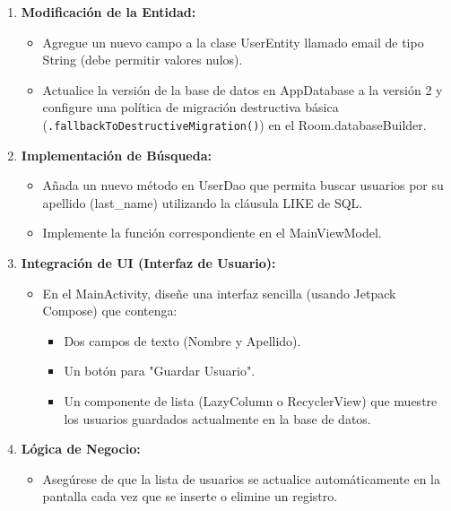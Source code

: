 \documentclass[10pt,letterpaper]{article}
\begin{document}
\newpage
\begin{enumerate}[label=\arabic*.]
  \item \textbf{Modificación de la Entidad:}
    \begin{itemize}
      \item Agregue un nuevo campo a la clase UserEntity llamado email de tipo String (debe permitir valores nulos).
      \item Actualice la versión de la base de datos en AppDatabase a la versión 2 y configure una política de migración destructiva básica (\texttt{.fallbackToDestructiveMigration()}) en el Room.databaseBuilder.
    \end{itemize}

  \item \textbf{Implementación de Búsqueda:}
    \begin{itemize}
      \item Añada un nuevo método en UserDao que permita buscar usuarios por su apellido (last\_name) utilizando la cláusula LIKE de SQL.
      \item Implemente la función correspondiente en el MainViewModel.
    \end{itemize}

  \item \textbf{Integración de UI (Interfaz de Usuario):}
    \begin{itemize}
      \item En el MainActivity, diseñe una interfaz sencilla (usando Jetpack Compose) que contenga:
        \begin{itemize}[label=$\circ$]
          \item Dos campos de texto (Nombre y Apellido).
          \item Un botón para "Guardar Usuario".
          \item Un componente de lista (LazyColumn o RecyclerView) que muestre los usuarios guardados actualmente en la base de datos.
        \end{itemize}
    \end{itemize}

  \item \textbf{Lógica de Negocio:}
    \begin{itemize}
      \item Asegúrese de que la lista de usuarios se actualice automáticamente en la pantalla cada vez que se inserte o elimine un registro.
    \end{itemize}
\end{enumerate}
\end{document}
